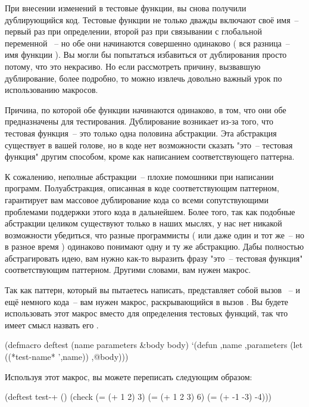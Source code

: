 При внесении изменений в тестовые функции, вы снова получили дублирующийся код. Тестовые
функции не только дважды включают своё имя~-- первый раз при определении, второй раз при
связывании с глобальной переменной ~-- но обе они начинаются совершенно
одинаково ( вся разница~-- имя функции ). Вы могли бы попытаться избавиться от
дублирования просто потому, что это некрасиво. Но если рассмотреть причину, вызвавшую
дублирование, более подробно, то можно извлечь довольно важный урок по использованию
макросов.

Причина, по которой обе функции начинаются одинаково, в том, что они обе предназначены для
тестирования. Дублирование возникает из-за того, что тестовая функция~-- это только одна
половина абстракции. Эта абстракция существует в вашей голове, но в коде нет возможности
сказать "это~-- тестовая функция" другим способом, кроме как написанием соответствующего
паттерна.

К сожалению, неполные абстракции~-- плохие помошники при написании
программ. Полуабстракция, описанная в коде соответствующим паттерном, гарантирует вам
массовое дублирование кода со всеми сопутствующими проблемами поддержки этого кода в
дальнейшем. Более того, так как подобные абстракции целиком существуют только в наших
мыслях, у нас нет никакой возможности убедиться, что разные программисты ( или даже один и
тот же~-- но в разное время ) одинаково понимают одну и ту же абстракцию. Дабы полностью
абстрагировать идею, вам нужно как-то выразить фразу "это~-- тестовая функция"
соответствующим паттерном. Другими словами, вам нужен макрос.

Так как паттерн, который вы пытаетесь написать, представляет собой вызов ~--
и ещё немного кода~-- вам нужен макрос, раскрывающийся в вызов . Вы будете
использовать этот макрос вместо  для определения тестовых функций, так что
имеет смысл назвать его .

\begin{myverb}
(defmacro deftest (name parameters &body body)
  `(defun ,name ,parameters
    (let ((*test-name* ',name))
      ,@body)))
\end{myverb}

Используя этот макрос, вы можете переписать  следующим образом:

\begin{myverb}
(deftest test-+ ()
  (check
    (= (+ 1 2) 3)
    (= (+ 1 2 3) 6)
    (= (+ -1 -3) -4)))
\end{myverb}

